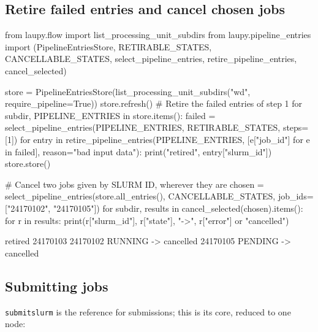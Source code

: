 \documentclass[11pt,a4paper]{article}
\DeclareRobustCommand{\_}{\textunderscore\allowbreak}
\newcommand{\cmd}[1]{\texttt{#1}}
\begin{document}
\subsection{Retire failed entries and cancel chosen jobs}

\begin{code}
from laupy.flow import list_processing_unit_subdirs
from laupy.pipeline_entries import (PipelineEntriesStore, RETIRABLE_STATES, CANCELLABLE_STATES,
                                    select_pipeline_entries, retire_pipeline_entries, cancel_selected)

store = PipelineEntriesStore(list_processing_unit_subdirs("wd", require_pipeline=True))
store.refresh()
# Retire the failed entries of step 1
for subdir, PIPELINE_ENTRIES in store.items():
    failed = select_pipeline_entries(PIPELINE_ENTRIES, RETIRABLE_STATES, steps=[1])
    for entry in retire_pipeline_entries(PIPELINE_ENTRIES, [e["job_id"] for e in failed],
                                         reason="bad input data"):
        print("retired", entry["slurm_id"])
store.store()

# Cancel two jobs given by SLURM ID, wherever they are
chosen = select_pipeline_entries(store.all_entries(), CANCELLABLE_STATES,
                                 job_ids=["24170102", "24170105"])
for subdir, results in cancel_selected(chosen).items():
    for r in results:
        print(r["slurm_id"], r["state"], "->", r["error"] or "cancelled")
\end{code}

\begin{terminal}
retired 24170103
24170102 RUNNING -> cancelled
24170105 PENDING -> cancelled
\end{terminal}

\subsection{Submitting jobs}

\cmd{submitslurm} is the reference for submissions; this is its core, reduced to one node:
\end{document}
